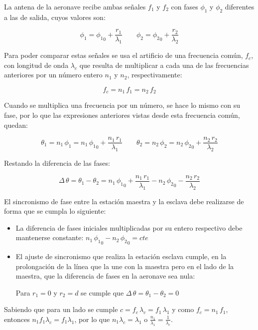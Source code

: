 \begin{description}
La antena de la aeronave recibe ambas se\~nales $f_1$ y $f_2$ con fases $\phi_1$ y $\phi_2$ diferentes a las de salida, cuyos valores son:

\[
\phi_1 = {\phi_1}_0 + \displaystyle \frac{r_1}{\lambda_1} \qquad
\phi_2 = {\phi_2}_0 + \displaystyle \frac{r_2}{\lambda_2} 
\]

Para poder comparar estas se\~nales se usa el artificio de una frecuencia com\'un, $f_c$, con longitud de onda $\lambda_c$ que resulta de multiplicar a cada una de las frecuencias anteriores por un n\'umero entero $n_1$ y $n_2$, respectivamente:

\[
f_c = n_1\,f_1 = n_2\,f_2
\]

Cuando se multiplica una frecuencia por un n\'umero, se hace lo mismo con su fase, por lo que las expresiones anteriores vistas desde esta frecuencia com\'un, quedan:

\[
\theta_1 = n_1\,\phi_1 = n_1\,{\phi_1}_0 + \displaystyle \frac{n_1\,r_1}{\lambda_1} \qquad
\theta_2 = n_2\,\phi_2 = n_2\,{\phi_2}_0 + \displaystyle \frac{n_2\,r_2}{\lambda_2} 
\]

Restando la diferencia de las fases:

\[
\Delta\,\theta = \theta_1-\theta_2 = n_1\,{\phi_1}_0 + \displaystyle \frac{n_1\,r_1}{\lambda_1} -  n_2\,{\phi_2}_0 - \displaystyle \frac{n_2\,r_2}{\lambda_2} 
\]

El sincronismo de fase entre la estaci\'on maestra y la esclava debe realizarse de forma que se cumpla lo siguiente:

\begin{itemize}
\item La diferencia de fases iniciales multiplicadas por su entero respectivo debe mantenerse constante: $n_1\,{\phi_1}_0- n_2\,{\phi_2}_0= cte$

\item El ajuste de sincronismo que realiza la estaci\'on esclava cumple, en la prolongaci\'on de la l\'inea que la une con la maestra pero en el lado de la maestra, que la diferencia de fases en la aeronave sea nula: 

Para $r_1=0$ y $r_2=d$ se cumple que $\Delta\,\theta = \theta_1-\theta_2 =0$

\end{itemize}

Sabiendo que para un lado se cumple $c = f_c\,\lambda_c = f_1\,\lambda_1$ y como $f_c=n_1\,f_1$, entonces $n_1f_1\lambda_c = f_1\lambda_1$, por lo que $n_1\lambda_c=\lambda_1$ o $\displaystyle \frac{n_1}{\lambda_1}=\frac{1}{\lambda_c}$.


\end{description}

